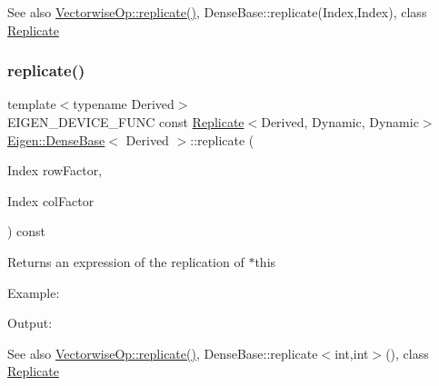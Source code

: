 \begin{DoxySeeAlso}{See also}
\mbox{\hyperlink{class_eigen_1_1_vectorwise_op_a5f0c8dc9e9c4aeaa2057f15800f5c18c}{Vectorwise\+Op\+::replicate()}}, Dense\+Base\+::replicate(\+Index,\+Index), class \mbox{\hyperlink{class_eigen_1_1_replicate}{Replicate}} 
\end{DoxySeeAlso}
\mbox{\label{class_eigen_1_1_dense_base_a4475dc25a383c84656f5c55b890ecacf}} 
\subsubsection{\texorpdfstring{replicate()}{replicate()}\hspace{0.1cm}{\footnotesize\ttfamily [2/2]}}
{\footnotesize\ttfamily template$<$typename Derived$>$ \\
E\+I\+G\+E\+N\+\_\+\+D\+E\+V\+I\+C\+E\+\_\+\+F\+U\+NC const \mbox{\hyperlink{class_eigen_1_1_replicate}{Replicate}}$<$Derived, Dynamic, Dynamic$>$ \mbox{\hyperlink{class_eigen_1_1_dense_base}{Eigen\+::\+Dense\+Base}}$<$ Derived $>$\+::replicate (\begin{DoxyParamCaption}\item[{Index}]{row\+Factor,  }\item[{Index}]{col\+Factor }\end{DoxyParamCaption}) const\hspace{0.3cm}{\ttfamily [inline]}}

\begin{DoxyReturn}{Returns}
an expression of the replication of {\ttfamily $\ast$this} 
\end{DoxyReturn}
Example\+: 
\begin{DoxyCodeInclude}{0}
\end{DoxyCodeInclude}
 Output\+: 
\begin{DoxyVerbInclude}
\end{DoxyVerbInclude}


\begin{DoxySeeAlso}{See also}
\mbox{\hyperlink{class_eigen_1_1_vectorwise_op_a5f0c8dc9e9c4aeaa2057f15800f5c18c}{Vectorwise\+Op\+::replicate()}}, Dense\+Base\+::replicate$<$int,int$>$(), class \mbox{\hyperlink{class_eigen_1_1_replicate}{Replicate}} 
\end{DoxySeeAlso}
\mbox{\label{class_eigen_1_1_dense_base_a13027a493a68a13496610caf3d81bd3e}} 

